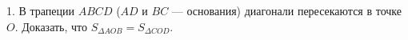 1. В трапеции $ABCD$ ($AD$ и $BC$ --- основания) диагонали пересекаются в точке $O.$ Доказать, что $S_{\Delta AOB}=S_{\Delta COD}.$\\
